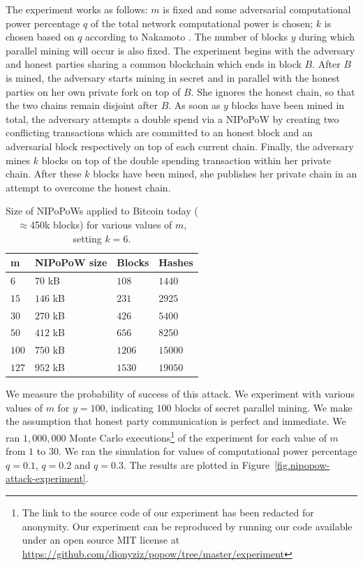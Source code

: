 The experiment works as follows: $m$ is fixed and some adversarial computational
power percentage $q$ of the total network computational power is chosen; $k$ is
chosen based on $q$ according to Nakamoto \cite{bitcoin}. The number of blocks
$y$ during which parallel mining will occur is also fixed. The experiment begins
with the adversary and honest parties sharing a common blockchain which ends in
block $B$. After $B$ is mined, the adversary starts mining in secret and in
parallel with the honest parties on her own private fork on top of $B$. She
ignores the honest chain, so that the two chains remain disjoint after $B$. As
soon as $y$ blocks have been mined in total, the adversary attempts a double
spend via a NIPoPoW
by creating two conflicting transactions which are committed to an honest
block and an adversarial block respectively on top of each current chain.
Finally, the adversary mines $k$ blocks on top of the double spending
transaction within her private chain. After these $k$ blocks have been mined,
she publishes her private chain in an attempt to overcome the honest chain.


\begin{table}
  \caption{
    \label{table.size}
    Size of NIPoPoWs applied to Bitcoin today
    ($\approx$450k blocks) for various values of $m$,
    setting $k = 6$.
  }
  \centering
  \begin{tabular}{l|l|l|l}
      {\bf m}  & {\bf NIPoPoW size} & {\bf Blocks} & {\bf
      Hashes}\\
      \hline
      $6$   & $70$  kB & $108$ & $1440$  \\
      $15$  & $146$ kB & $231$ & $2925$  \\
      $30$  & $270$ kB & $426$ & $5400$  \\
      $50$  & $412$ kB & $656$ & $8250$ \\
      $100$ & $750$ kB & $1206$ & $15000$ \\
      $127$ & $952$ kB & $1530$ & $19050$ \\
  \end{tabular}
\end{table}



We measure the probability of success of this attack. We experiment with various
values of $m$ for $y = 100$, indicating $100$ blocks of secret parallel mining.
We make the assumption that honest party communication is perfect and immediate.
We ran $1,000,000$ Monte Carlo executions\footnote{
\ifanonymous
The link to the source code of our experiment has been redacted for anonymity.
\else
Our experiment can be reproduced by running our code available under
an open source MIT license at
\url{https://github.com/dionyziz/popow/tree/master/experiment}
\fi
}
of the experiment for each value
of $m$ from $1$ to $30$. We ran the simulation for values of computational power
percentage $q = 0.1$, $q = 0.2$ and $q = 0.3$. The results are plotted in
Figure~\ref{fig.nipopow-attack-experiment}.

